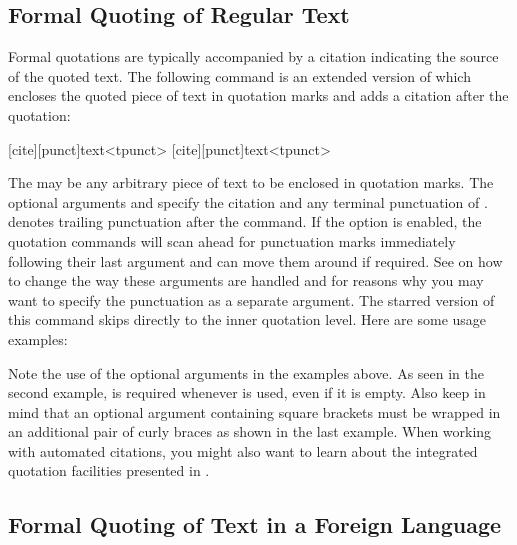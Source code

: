 \documentclass{ltxdockit}[2010/09/26]
\begin{document}
\subsection{Formal Quoting of Regular Text}
\label{bas:txt:reg}

Formal quotations are typically accompanied by a citation indicating the source of the quoted text. The following command is an extended version of  which encloses the quoted piece of text in quotation marks and adds a citation after the quotation:

\begin{ltxsyntax}

[cite][punct]{text}<tpunct>
[cite][punct]{text}<tpunct>

The  may be any arbitrary piece of text to be enclosed in quotation marks. The optional arguments  and  specify the citation and any terminal punctuation of .  denotes trailing punctuation after the command. If the  option is enabled, the quotation commands will scan ahead for punctuation marks immediately following their last argument and can move them around if required. See  on how to change the way these arguments are handled and  for reasons why you may want to specify the punctuation as a separate argument. The starred version of this command skips directly to the inner quotation level. Here are some usage examples:

\begin{ltxcode}
\end{ltxcode}
%
Note the use of the optional arguments in the examples above. As seen in the second example,  is required whenever  is used, even if it is empty. Also keep in mind that an optional argument containing square brackets must be wrapped in an additional pair of curly braces as shown in the last example. When working with automated citations, you might also want to learn about the integrated quotation facilities presented in .

\end{ltxsyntax}

\subsection{Formal Quoting of Text in a Foreign Language}
\label{bas:txt:bbl}
\end{document}
